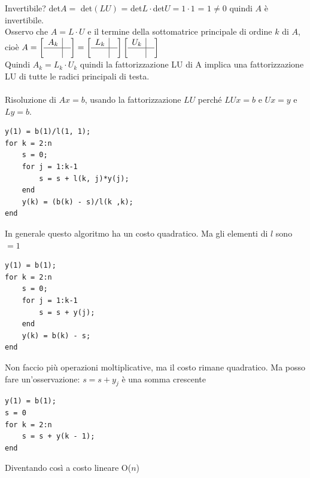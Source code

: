 \documentclass[10pt]{book}
\begin{document}
Invertibile? det$A =$ det$(LU)$ = det$L\cdot$det$U = 1 \cdot 1$ = $1 \neq 0$ quindi $A$ è invertibile.\\
Osservo che $A = L \cdot U$ e il termine della sottomatrice principale di ordine $k$ di $A$, cioè \begin{math}
A = \left[
\begin{array}{c | c}
	A_k & \\
	\hline
	&
\end{array}
\right]
= \left[
\begin{array}{c | c}
	L_k & \\
	\hline
	&
\end{array}
\right]
\left[
\begin{array}{c | c}
	U_k & \\
	\hline
	&
\end{array}
\right]
\end{math}\\
Quindi $A_k = L_k\cdot U_k$ quindi la fattorizzazione LU di A implica una fattorizzazione LU di tutte le radici principali di testa.\\\\
Risoluzione di $Ax = b$, usando la fattorizzazione $LU$ perché $LUx = b$ e $Ux = y$ e $Ly = b$.
\begin{lstlisting}
y(1) = b(1)/l(1, 1);
for k = 2:n
	s = 0;
	for j = 1:k-1
		s = s + l(k, j)*y(j);
	end
	y(k) = (b(k) - s)/l(k ,k);
end
\end{lstlisting}
In generale questo algoritmo ha un costo quadratico. Ma gli elementi di $l$ sono $= 1$
\begin{lstlisting}
y(1) = b(1);
for k = 2:n
	s = 0;
	for j = 1:k-1
		s = s + y(j);
	end
	y(k) = b(k) - s;
end
\end{lstlisting}
Non faccio più operazioni moltiplicative, ma il costo rimane quadratico. Ma posso fare un'osservazione: $s = s + y_j$ è una somma crescente
\begin{lstlisting}
y(1) = b(1);
s = 0
for k = 2:n
	s = s + y(k - 1);
end
\end{lstlisting}
Diventando così a costo lineare O($n$)
\pagebreak
\end{document}
